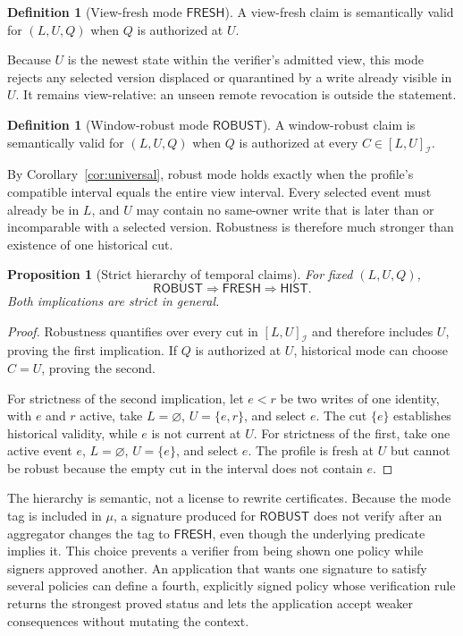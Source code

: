 \documentclass[11pt]{article}
\newtheorem{proposition}[theorem]{Proposition}
\theoremstyle{definition}
\newtheorem{definition}[theorem]{Definition}
\newcommand{\Id}{\mathcal I}
\begin{document}
\begin{definition}[View-fresh mode $\mathsf{FRESH}$]
A view-fresh claim is semantically valid for $(L,U,Q)$ when $Q$ is authorized at $U$.
\end{definition}
Because $U$ is the newest state within the verifier's admitted view, this mode rejects any selected version displaced or quarantined by a write already visible in $U$.  It remains view-relative: an unseen remote revocation is outside the statement.

\begin{definition}[Window-robust mode $\mathsf{ROBUST}$]
A window-robust claim is semantically valid for $(L,U,Q)$ when $Q$ is authorized at every $C\in[L,U]_{\Id}$.
\end{definition}
By Corollary~\ref{cor:universal}, robust mode holds exactly when the profile's compatible interval equals the entire view interval.  Every selected event must already be in $L$, and $U$ may contain no same-owner write that is later than or incomparable with a selected version.  Robustness is therefore much stronger than existence of one historical cut.


\begin{proposition}[Strict hierarchy of temporal claims]\label{prop:modes}
For fixed $(L,U,Q)$,
\[
  \mathsf{ROBUST}\Longrightarrow\mathsf{FRESH}\Longrightarrow\mathsf{HIST}.
\]
Both implications are strict in general.
\end{proposition}
\begin{proof}
Robustness quantifies over every cut in $[L,U]_{\Id}$ and therefore includes $U$, proving the first implication.  If $Q$ is authorized at $U$, historical mode can choose $C=U$, proving the second.

For strictness of the second implication, let $e<r$ be two writes of one identity, with $e$ and $r$ active, take $L=\varnothing$, $U=\{e,r\}$, and select $e$.  The cut $\{e\}$ establishes historical validity, while $e$ is not current at $U$.  For strictness of the first, take one active event $e$, $L=\varnothing$, $U=\{e\}$, and select $e$.  The profile is fresh at $U$ but cannot be robust because the empty cut in the interval does not contain $e$.
\end{proof}

The hierarchy is semantic, not a license to rewrite certificates.  Because the mode tag is included in $\mu$, a signature produced for $\mathsf{ROBUST}$ does not verify after an aggregator changes the tag to $\mathsf{FRESH}$, even though the underlying predicate implies it.  This choice prevents a verifier from being shown one policy while signers approved another.  An application that wants one signature to satisfy several policies can define a fourth, explicitly signed policy whose verification rule returns the strongest proved status and lets the application accept weaker consequences without mutating the context.
\end{document}
